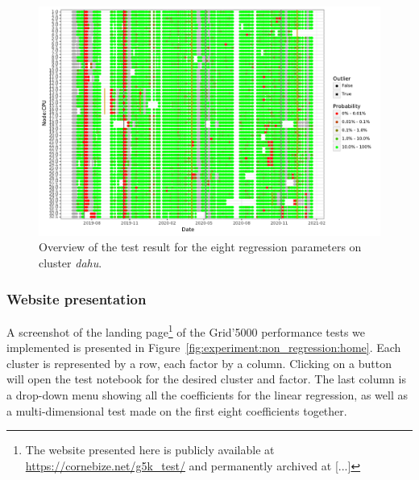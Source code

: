                 \begin{figure}[htpb]
                    \centering
                    \includegraphics[width=\linewidth]{img/experiment/non_regression/implementation/overview_multifactor.pdf}
                    \caption{Overview of the test result for the eight regression parameters on cluster \emph{dahu}.}
                    \label{fig:experiment:non_regression:overview_multifactor}
                \end{figure}

            \subsubsection{Website presentation}%

                A screenshot of the landing page\footnote{The website presented here is publicly available at
                \url{https://cornebize.net/g5k_test/} and permanently archived at [...]} of the
                Grid'5000 performance tests we implemented is presented in
                Figure~\ref{fig:experiment:non_regression:home}. Each cluster is represented by a row, each factor by a
                column. Clicking on a button will open the test notebook for the desired cluster and factor. The last
                column is a drop-down menu showing all the coefficients for the linear regression, as well as a
                multi-dimensional test made on the first eight coefficients together.

